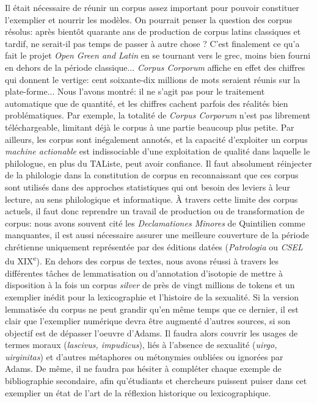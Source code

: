 Il était nécessaire de réunir un corpus assez important pour pouvoir constituer l'exemplier et nourrir les modèles. On pourrait penser la question des corpus résolus: après bientôt quarante ans de production de corpus latins classiques et tardif, ne serait-il pas temps de passer à autre chose ? C'est finalement ce qu'a fait le projet \textit{Open Green and Latin} en se tournant vers le grec, moins bien fourni en dehors de la période classique... \textit{Corpus Corporum} affiche en effet des chiffres qui donnent le vertige: cent soixante-dix millions de mots seraient réunis sur la plate-forme... Nous l'avons montré: il ne s'agit pas pour le traitement automatique que de quantité, et les chiffres cachent parfois des réalités bien problématiques. Par exemple, la totalité de \textit{Corpus Corporum} n'est pas librement téléchargeable, limitant déjà le corpus à une partie beaucoup plus petite. Par ailleurs, les corpus sont inégalement annotés, et la capacité d'exploiter un corpus \textit{machine actionable} est indissociable d'une exploitation de qualité dans laquelle le philologue, en plus du TAListe, peut avoir confiance. Il faut absolument réinjecter de la philologie dans la constitution de corpus en reconnaissant que ces corpus sont utilisés dans des approches statistiques qui ont besoin des leviers à leur lecture, au sens philologique et informatique. À travers cette limite des corpus actuels, il faut donc reprendre un travail de production ou de transformation de corpus: nous avons souvent cité les \textit{Declamationes Minores} de Quintilien comme manquantes, il est aussi nécessaire assurer une meilleure couverture de la période chrétienne uniquement représentée par des éditions datées (\textit{Patrologia} ou \textit{CSEL} du XIX\textsuperscript{e}). En dehors des corpus de textes, nous avons réussi à travers les différentes tâches de lemmatisation ou d'annotation d'isotopie de mettre à disposition à la fois un corpus \textit{silver} de près de vingt millions de tokens et un exemplier inédit pour la lexicographie et l'histoire de la sexualité. Si la version lemmatisée du corpus ne peut grandir qu'en même temps que ce dernier, il est clair que l'exemplier numérique devra être augmenté d'autres sources, si son objectif est de dépasser l'oeuvre d'Adams. Il faudra alors couvrir les usages de termes moraux (\textit{lascivus, impudicus}), liés à l'absence de sexualité (\textit{uirgo, uirginitas}) et d'autres métaphores ou métonymies oubliées ou ignorées par Adams. De même, il ne faudra pas hésiter à compléter chaque exemple de bibliographie secondaire, afin qu'étudiants et chercheurs puissent puiser dans cet exemplier un état de l'art de la réflexion historique ou lexicographique.

